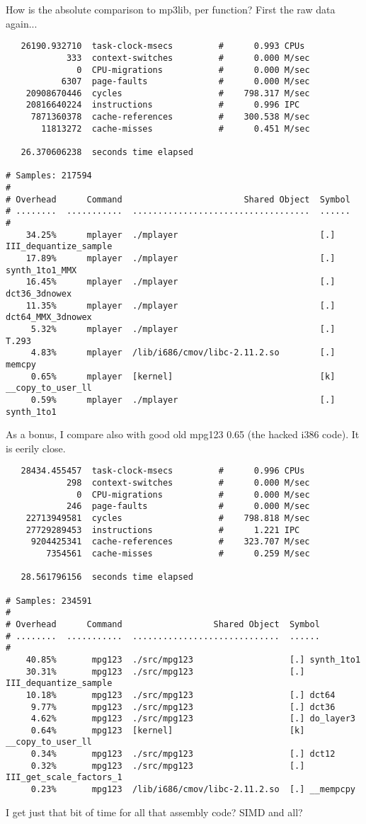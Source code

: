 \documentclass[a4paper,12pt]{scrartcl}
\begin{document}
How is the absolute comparison to mp3lib, per function? First the raw data again...
\begin{verbatim}
   26190.932710  task-clock-msecs         #      0.993 CPUs 
            333  context-switches         #      0.000 M/sec
              0  CPU-migrations           #      0.000 M/sec
           6307  page-faults              #      0.000 M/sec
    20908670446  cycles                   #    798.317 M/sec
    20816640224  instructions             #      0.996 IPC  
     7871360378  cache-references         #    300.538 M/sec
       11813272  cache-misses             #      0.451 M/sec

   26.370606238  seconds time elapsed

# Samples: 217594
#
# Overhead      Command                        Shared Object  Symbol
# ........  ...........  ...................................  ......
#
    34.25%      mplayer  ./mplayer                            [.] III_dequantize_sample
    17.89%      mplayer  ./mplayer                            [.] synth_1to1_MMX
    16.45%      mplayer  ./mplayer                            [.] dct36_3dnowex
    11.35%      mplayer  ./mplayer                            [.] dct64_MMX_3dnowex
     5.32%      mplayer  ./mplayer                            [.] T.293
     4.83%      mplayer  /lib/i686/cmov/libc-2.11.2.so        [.] memcpy
     0.65%      mplayer  [kernel]                             [k] __copy_to_user_ll
     0.59%      mplayer  ./mplayer                            [.] synth_1to1
\end{verbatim}

As a bonus, I compare also with good old mpg123 0.65 (the hacked i386 code). It is eerily close.
\begin{verbatim}
   28434.455457  task-clock-msecs         #      0.996 CPUs 
            298  context-switches         #      0.000 M/sec
              0  CPU-migrations           #      0.000 M/sec
            246  page-faults              #      0.000 M/sec
    22713949581  cycles                   #    798.818 M/sec
    27729289453  instructions             #      1.221 IPC  
     9204425341  cache-references         #    323.707 M/sec
        7354561  cache-misses             #      0.259 M/sec

   28.561796156  seconds time elapsed

# Samples: 234591
#
# Overhead      Command                  Shared Object  Symbol
# ........  ...........  .............................  ......
#
    40.85%       mpg123  ./src/mpg123                   [.] synth_1to1
    30.31%       mpg123  ./src/mpg123                   [.] III_dequantize_sample
    10.18%       mpg123  ./src/mpg123                   [.] dct64
     9.77%       mpg123  ./src/mpg123                   [.] dct36
     4.62%       mpg123  ./src/mpg123                   [.] do_layer3
     0.64%       mpg123  [kernel]                       [k] __copy_to_user_ll
     0.34%       mpg123  ./src/mpg123                   [.] dct12
     0.32%       mpg123  ./src/mpg123                   [.] III_get_scale_factors_1
     0.23%       mpg123  /lib/i686/cmov/libc-2.11.2.so  [.] __mempcpy
\end{verbatim}
I get just that bit of time for all that assembly code? SIMD and all?
\end{document}
